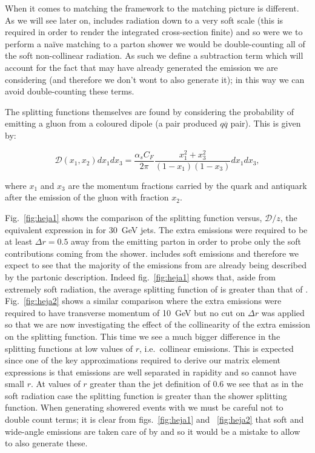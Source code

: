 		When it comes to matching the \hej framework to \ARIADNE the matching picture is different. As we
		will see later on, \HEJ includes radiation down to a very soft scale (this is required in order
		to render the integrated cross-section finite) and so were we to perform a na\"ive matching to a
		parton shower we would be double-counting all of the soft non-collinear radiation. As such we
		define a subtraction term which will account for the fact that \HEJ may have already generated
		the emission we are considering (and therefore we don't wont \ARIADNE to also generate it); in
		this way we can avoid double-counting these terms.

		The splitting functions themselves are found by considering the probability of emitting a gluon
		from a coloured dipole (a pair produced $q\overline{q}$ pair).  This is given by:

		\begin{equation}
			\mathcal{D}(x_1, x_2)dx_1dx_3 = \frac{\alpha_sC_F}{2\pi}\frac{x_1^2+x_3^2}{(1-x_1)(1-x_3)}dx_1dx_3,
		\end{equation}

		where $x_1$ and $x_3$ are the momentum fractions carried by the quark and antiquark after the emission
		of the gluon with fraction $x_2$.

		Fig.~\eqref{fig:heja1} shows the comparison of the \ARIADNE splitting function versus, $\mathcal{D}/z$,
		the equivalent expression in \HEJ for 30~GeV jets.  The extra emissions were required to be at least
		$\Delta r=0.5$ away from the emitting parton in order to probe only the soft contributions coming from
		the shower.  \HEJ includes soft emissions and therefore we expect to see that the majority of
		the emissions from \ARIADNE are already being described by the partonic description.  Indeed fig.~\eqref{fig:heja1}
		shows that, aside from extremely soft radiation, the average splitting function of \HEJ is greater than that of
		\ARIADNE. Fig.~\eqref{fig:heja2} shows a similar comparison where the extra emissions were required to have
		transverse momentum of 10~GeV but no cut on $\Delta r$ was applied so that we are now investigating the effect of
		the collinearity of the extra emission on the splitting function.  This time we see a much bigger difference in
		the splitting functions at low values of $r$, i.e.~collinear emissions.  This is expected since one of the key
		approximations required to derive our matrix element expressions is that emissions are well separated in rapidity
		and so cannot have small $r$.  At values of $r$ greater than the jet definition of 0.6 we see that as in the soft
		radiation case the \HEJ splitting function is greater than the shower splitting function.  When generating showered
		events with \HEJA we must be careful not to double count terms; it is clear from figs.~\eqref{fig:heja1} and
		~\eqref{fig:heja2} that soft and wide-angle emissions are taken care of by \HEJ and so it would be a mistake
		to allow \ARIADNE to also generate these.

